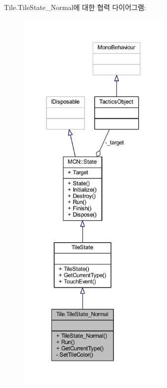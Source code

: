 Tile.\+Tile\+State\+\_\+\+Normal에 대한 협력 다이어그램\+:\nopagebreak
\begin{figure}[H]
\begin{center}
\leavevmode
\includegraphics[height=550pt]{class_tile_1_1_tile_state___normal__coll__graph}
\end{center}
\end{figure}
